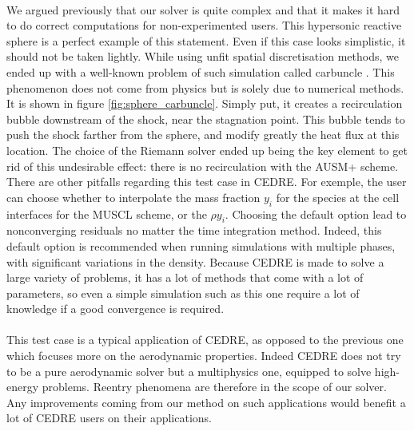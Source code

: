         \paragraph{}
        We argued previously that our solver is quite complex and that it makes it hard to do correct computations for non-experimented users.
        This hypersonic reactive sphere is a perfect example of this statement.
        Even if this case looks simplistic, it should not be taken lightly.
        While using unfit spatial discretisation methods, we ended up with a well-known problem of such simulation called carbuncle \cite{MacCormack2013}.
        This phenomenon does not come from physics but is solely due to numerical methods.
        It is shown in figure \ref{fig:sphere_carbuncle}.
        Simply put, it creates a recirculation bubble downstream of the shock, near the stagnation point.
        This bubble tends to push the shock farther from the sphere, and modify greatly the heat flux at this location.
        The choice of the Riemann solver ended up being the key element to get rid of this undesirable effect: there is no recirculation with the AUSM+ scheme.
        There are other pitfalls regarding this test case in CEDRE.
        For exemple, the user can choose whether to interpolate the mass fraction $y_i$ for the species at the cell interfaces for the MUSCL scheme, or the  $\rho y_i$.
        Choosing the default option lead to nonconverging residuals no matter the time integration method.
        Indeed, this default option is recommended when running simulations with multiple phases, with significant variations in the density.
        Because CEDRE is made to solve a large variety of problems, it has a lot of methods that come with a lot of parameters, so even a simple simulation such as this one require a lot of knowledge if a good convergence is required.

        \paragraph{}
        This test case is a typical application of CEDRE, as opposed to the previous one which focuses more on the aerodynamic properties.
        Indeed CEDRE does not try to be a pure aerodynamic solver but a multiphysics one, equipped to solve high-energy problems.
        Reentry phenomena are therefore in the scope of our solver.
        Any improvements coming from our method on such applications would benefit a lot of CEDRE users on their applications.


